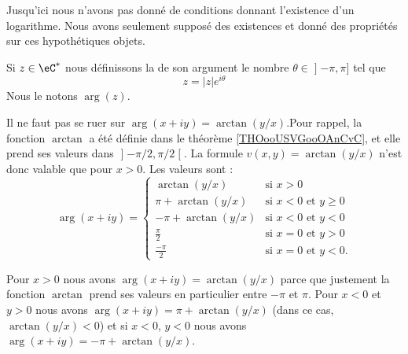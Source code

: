 \begin{remark}
    Jusqu'ici nous n'avons pas donné de conditions donnant l'existence d'un logarithme. Nous avons seulement supposé des existences et donné des propriétés sur ces hypothétiques objets.
\end{remark}

\begin{definition}
Si \( z\in \eC^*\) nous définissons la  de son argument le nombre \( \theta\in \mathopen] -\pi , \pi \mathclose]\) tel que 
\begin{equation}
    z=| z | e^{i\theta}
\end{equation}
Nous le notons \( \arg(z)\).
\end{definition}

\begin{normaltext}      \label{NORMooOGHNooYriCBH}
    Il ne faut pas se ruer sur \( \arg(x+iy)=\arctan(y/x)\).Pour rappel, la fonction \( \arctan\) a été définie dans le théorème \ref{THOooUSVGooOAnCvC}, et elle prend ses valeurs dans \( \mathopen] -\pi/2 , \pi/2 \mathclose[\). La formule \( v(x,y)=\arctan(y/x)\) n'est donc valable que pour \( x>0\). Les valeurs sont :
        \begin{equation}        \label{EQooPJVFooSEKTny}
            \arg(x+iy)=\begin{cases}
                 \arctan(y/x)   &   \text{si } x>0\\
                 \pi+\arctan(y/x)    &    \text{si } x<0\text{ et }y\geq 0 \\
                 -\pi+\arctan(y/x)    &    \text{si } x<0 \text{ et }y<0\\
                 \frac{ \pi }{ 2 }    &    \text{si } x=0 \text{ et }y>0\\
                 \frac{- \pi }{ 2 }    &    \text{si } x=0 \text{ et }y<0.
            \end{cases}
        \end{equation}

    Pour \( x>0\) nous avons \( \arg(x+iy)=\arctan(y/x)  \) parce que justement la fonction \( \arctan\) prend ses valeurs en particulier entre \( -\pi\) et \( \pi\). Pour \( x<0\) et \( y>0 \) nous avons \( \arg(x+iy)=\pi+\arctan(y/x)\) (dans ce cas, \( \arctan(y/x)<0\)) et si \( x<0\), \( y<0\) nous avons \( \arg(x+iy)=-\pi+\arctan(y/x)\).
\end{normaltext}

